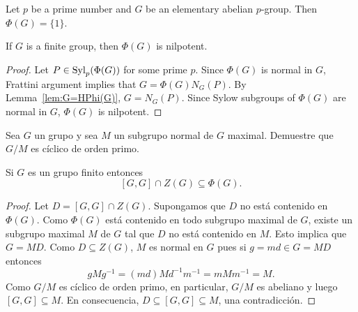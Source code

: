\begin{exercise}
	Let $p$ be a prime number and $G$ be an elementary abelian $p$-group. Then 
	$\Phi(G)=\{1\}$.
\end{exercise}

\begin{theorem}[Frattini]
	\label{theorem:Frattini}
	If $G$ is a finite group, then $\Phi(G)$ is nilpotent. 
\end{theorem}

\begin{proof}
	Let $P\in\mathrm{Syl}_p(\Phi(G))$ for some prime $p$. Since $\Phi(G)$ is normal in
	$G$, Frattini argument implies that 
	$G=\Phi(G)N_G(P)$. By Lemma~\ref{lem:G=HPhi(G)},
	$G=N_G(P)$. Since Sylow subgroups of $\Phi(G)$ are normal in $G$,
	$\Phi(G)$ is nilpotent.
\end{proof}

\begin{exercise}
	\label{exercise:G/M}
	Sea $G$ un grupo y sea $M$ un subgrupo normal de $G$ maximal. Demuestre que
	$G/M$ es cíclico de orden primo. 
\end{exercise}


\begin{theorem}
	\label{thm:Gaschutz}
	Si $G$ es un grupo finito entonces 
	\[
	[G,G]\cap Z(G)\subseteq\Phi(G).
	\]
\end{theorem}

\begin{proof}
	Let $D=[G,G]\cap Z(G)$. Supongamos que $D$ no está contenido en $\Phi(G)$.
	Como $\Phi(G)$ está contenido en todo subgrupo maximal de $G$, existe un
	subgrupo maximal $M$ de $G$ tal que $D$ no está contenido en $M$.  Esto
	implica que $G=MD$. Como $D\subseteq Z(G)$, $M$ es normal en $G$ pues si
	$g=md\in G=MD$ entonces
	\[
		gMg^{-1}=(md)Md^{-1}m^{-1}=mMm^{-1}=M.
	\]
	Como $G/M$ es cíclico de orden
	primo, en particular, $G/M$ es abeliano y luego $[G,G]\subseteq M$. En consecuencia, 
	$D\subseteq [G,G]\subseteq M$, una contradicción.
\end{proof}

